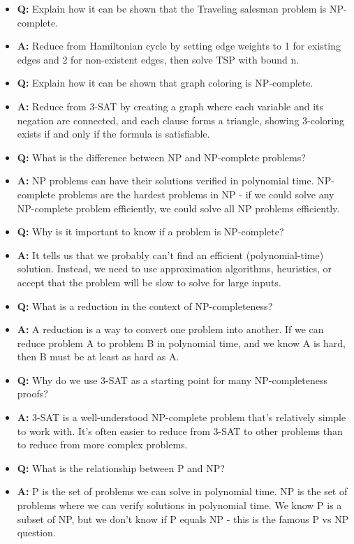 \documentclass[11pt,a4paper]{article}
\begin{document}
\begin{multicols}{2}
\begin{itemize}
    \item \textbf{Q:} Explain how it can be shown that the Traveling salesman problem is NP-complete.
    \item \textbf{A:} Reduce from Hamiltonian cycle by setting edge weights to 1 for existing edges and 2 for non-existent edges, then solve TSP with bound n.

    \item \textbf{Q:} Explain how it can be shown that graph coloring is NP-complete.
    \item \textbf{A:} Reduce from 3-SAT by creating a graph where each variable and its negation are connected, and each clause forms a triangle, showing 3-coloring exists if and only if the formula is satisfiable.

    \item \textbf{Q:} What is the difference between NP and NP-complete problems?
    \item \textbf{A:} NP problems can have their solutions verified in polynomial time. NP-complete problems are the hardest problems in NP - if we could solve any NP-complete problem efficiently, we could solve all NP problems efficiently.

    \item \textbf{Q:} Why is it important to know if a problem is NP-complete?
    \item \textbf{A:} It tells us that we probably can't find an efficient (polynomial-time) solution. Instead, we need to use approximation algorithms, heuristics, or accept that the problem will be slow to solve for large inputs.

    \item \textbf{Q:} What is a reduction in the context of NP-completeness?
    \item \textbf{A:} A reduction is a way to convert one problem into another. If we can reduce problem A to problem B in polynomial time, and we know A is hard, then B must be at least as hard as A.

    \item \textbf{Q:} Why do we use 3-SAT as a starting point for many NP-completeness proofs?
    \item \textbf{A:} 3-SAT is a well-understood NP-complete problem that's relatively simple to work with. It's often easier to reduce from 3-SAT to other problems than to reduce from more complex problems.

    \item \textbf{Q:} What is the relationship between P and NP?
    \item \textbf{A:} P is the set of problems we can solve in polynomial time. NP is the set of problems where we can verify solutions in polynomial time. We know P is a subset of NP, but we don't know if P equals NP - this is the famous P vs NP question.


\end{itemize}
\end{multicols}
\end{document}
